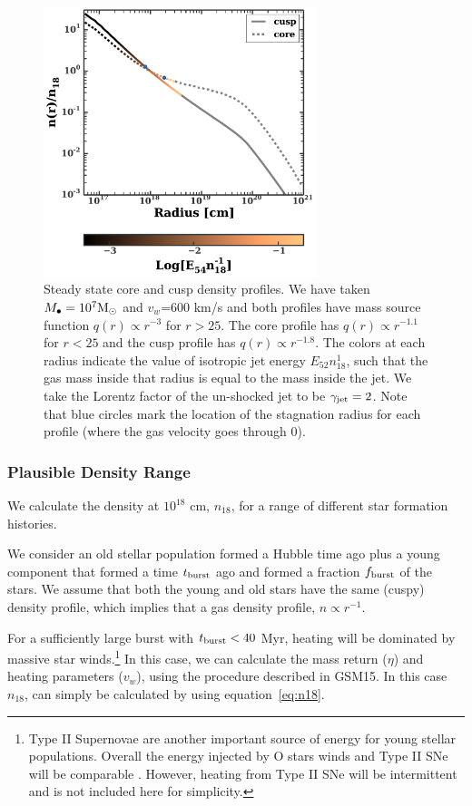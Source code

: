 \documentclass[usenatbib,fleqn]{mnras}
\newcommand{\Mbh}[1][]{M_{\bullet#1}}
\newcommand{\Msun}{{\rm M_\odot}}
\begin{document}
\begin{figure}
\includegraphics[width=8cm]{sedov_radius.pdf}
\caption{\label{fig:profiles} Steady state core and cusp density
  profiles. We have taken $\Mbh=10^{7} \Msun$ and $v_w$=600 km/s and
  both profiles have mass source function $q(r) \propto
  r^{-3}$ for $r > 25$. The core profile has $q(r) \propto
  r^{-1.1}$ for $r < 25$ and the cusp profile has $q(r)
  \propto r^{-1.8}$.  The colors at each radius indicate the value of
  isotropic jet energy $E_{52} n_{18}^{1}$, such that the gas mass
  inside that radius is equal to the mass inside the jet. We take the
  Lorentz factor of the un-shocked jet to be $\gamma_{\rm jet}=2$.
  Note that blue circles mark the location of the stagnation radius
      for each profile (where the gas velocity goes through 0).}
\end{figure}



\subsubsection{Plausible Density Range}
\label{sec:densAllowed}

We calculate the density at $10^{18}$ cm, $n_{18}$, for a range of
different star formation histories. 

We consider an old stellar population formed a Hubble time ago plus a
young component that formed a time $t_{\rm burst}$ ago and formed a
fraction $f_{\rm burst}$ of the stars. We assume that both the young
and old stars have the same (cuspy) density profile, which implies
that a gas density profile, $n\propto r^{-1}$. 

For a sufficiently large burst with $t_{\rm burst}<40$ Myr, heating
will be dominated by massive star winds.\footnote{Type II Supernovae
  are another important source of energy for young stellar
  populations. Overall the energy injected by O stars winds and Type
  II SNe will be comparable \citep{Voss+2009}. However, heating from
  Type II SNe will be intermittent and is not included here for
  simplicity.} In this case, we can calculate the mass return ($\eta$)
and heating parameters ($v_w$), using the procedure described in
GSM15. In this case $n_{18}$, can simply be calculated by using
equation~\eqref{eq:n18}.
\end{document}
